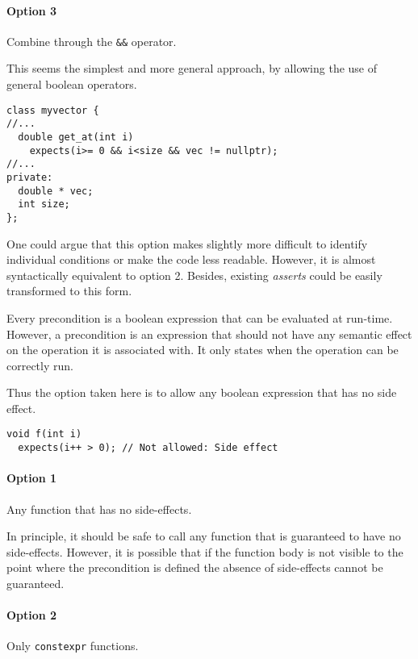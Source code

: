 \paragraph{Option 3} Combine through the \texttt{\&\&} operator.

This seems the simplest and more general approach, by allowing the use of
general boolean operators.

\begin{lstlisting}
class myvector {
//...
  double get_at(int i)
    expects(i>= 0 && i<size && vec != nullptr);
//...
private:
  double * vec;
  int size;
};
\end{lstlisting}

One could argue that this option makes slightly more difficult to identify
individual conditions or make the code less readable. However, it is almost
syntactically equivalent to option 2. Besides, existing \emph{asserts} could be
easily transformed to this form.


Every precondition is a boolean expression that can be evaluated at run-time.
However, a precondition is an expression that should not have any semantic
effect on the operation it is associated with. It only states when the operation
can be correctly run.

Thus the option taken here is to allow any boolean expression that has no side
effect.

\begin{lstlisting}
void f(int i)
  expects(i++ > 0); // Not allowed: Side effect
\end{lstlisting}


\paragraph{Option 1} Any function that has no side-effects.

In principle, it should be safe to call any function that is guaranteed to have
no side-effects. However, it is possible that if the function body is not
visible to the point where the precondition is defined the absence of
side-effects cannot be guaranteed.

\paragraph{Option 2} Only \texttt{constexpr} functions.

